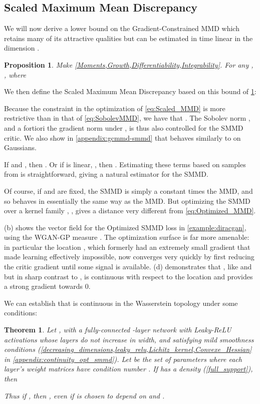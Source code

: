 \documentclass{article}
\newtheorem{theorem}{Theorem}
\newtheorem{prop}[lem]{Proposition}
\begin{document}
\subsection{Scaled Maximum Mean Discrepancy \label{subsec:Scaled-MMD}}

We will now derive a lower bound on the Gradient-Constrained MMD
which retains many of its attractive qualities
but can be estimated in time linear in the dimension .
\begin{prop} \label{prop:Sobolev_Upperbound}
  Make \cref{Moments,Growth,Differentiability,Integrability}.
  For any ,
,
where
  
\end{prop}
We then define the Scaled Maximum Mean Discrepancy based on this bound of \cref{prop:Sobolev_Upperbound}:

Because the constraint in the optimization of \eqref{eq:Scaled_MMD}
is more restrictive than in that of \eqref{eq:SobolevMMD},
we have that .
The Sobolev norm ,
and a fortiori the gradient norm under ,
is thus also controlled for the SMMD critic.
We also show in
\cref{appendix:gcmmd-smmd}
that  behaves similarly to 
on Gaussians.

If 
and ,
then .
Or if  is linear, ,
    then .
Estimating these terms based on samples from  is straightforward,
giving a natural estimator for the SMMD.

Of course,
if  and  are fixed,
the SMMD is simply a constant times the MMD,
and so behaves in essentially the same way as the MMD.
But optimizing the SMMD over a kernel family ,
,
gives a distance very different from  \eqref{eq:Optimized_MMD}.

 (b) shows the vector field for the Optimized SMMD loss in \cref{example:diracgan},
using the WGAN-GP measure .
The optimization surface is far more amenable:
in particular the location ,
which formerly had an extremely small gradient that made learning effectively impossible,
now converges very quickly by first reducing the critic gradient until some signal is available.
 (d) demonstrates that
, like  and 
but in sharp contrast to ,
is continuous with respect to the location  and provides a strong gradient towards 0.


We can establish that  is continuous in the Wasserstein topology under some conditions:
\begin{theorem}\label{thm:continuity_opt_SMMD}
Let ,
with  a fully-connected -layer network
with Leaky-ReLU activations
whose layers do not increase in width,
and  satisfying mild smoothness conditions 
(\cref{decreasing_dimensions,leaky_relu,Lichitz_kernel,Convexe_Hessian} in \cref{appendix:continuity_opt_smmd}).
Let  be the set of parameters where each layer's weight matrices have condition number .
If  has a density (\cref{full_support}),
then

Thus if , then ,
even if  is chosen to depend on  and .
\end{theorem}
\end{document}
